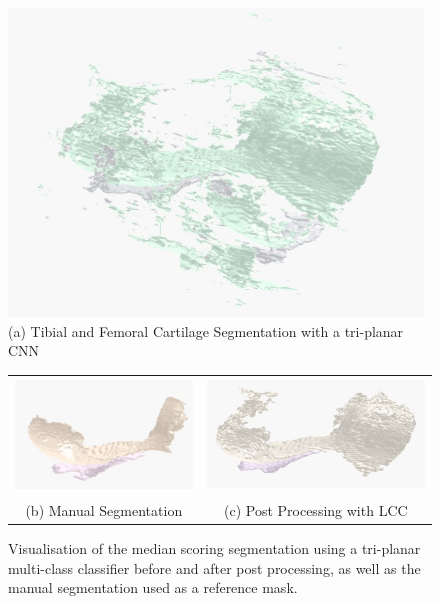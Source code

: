 \documentclass[11pt,a4paper]{memoir}
\numberwithin{figure}{section}
\numberwithin{table}{section}
\numberwithin{equation}{section}
\begin{document}
\begin{figure}[!h]
 \centering
 \includegraphics[width=110mm]{comppre.jpeg}\\

  (a) Tibial and Femoral Cartilage Segmentation with a tri-planar CNN\\
   \vspace{1cm}
 \begin{tabular}{cc}

  \includegraphics[height=30mm]{label.jpeg} &   \includegraphics[height=30mm]{compz2.jpeg} \\
(b) Manual Segmentation & (c) Post Processing with LCC\\

\end{tabular}

\caption[Visualisation of tibial and femoral cartilage segmentation using a multi-class CNN]{Visualisation of the median scoring segmentation using a tri-planar multi-class classifier before and after post processing, as well as the manual segmentation used as a reference mask. }
\label{compim}
\end{figure}
\clearpage
\end{document}
